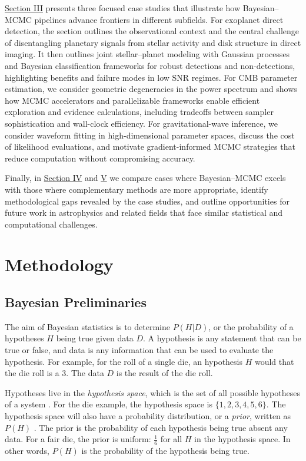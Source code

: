 \documentclass[preprint,longauthor]{aastex631}
\numberwithin{equation}{section}
\begin{document}
\hyperref[sec:CaseStudies]{Section III} presents three focused case studies that illustrate how Bayesian–MCMC pipelines advance frontiers in different subfields. For exoplanet direct detection, the section outlines the observational context and the central challenge of disentangling planetary signals from stellar activity and disk structure in direct imaging. It then outlines joint stellar–planet modeling with Gaussian processes and Bayesian classification frameworks for robust detections and non-detections, highlighting benefits and failure modes in low SNR regimes. For CMB parameter estimation, we consider geometric degeneracies in the power spectrum and shows how MCMC accelerators and parallelizable frameworks enable efficient exploration and evidence calculations, including tradeoffs between sampler sophistication and wall-clock efficiency. For gravitational-wave inference, we consider waveform fitting in high-dimensional parameter spaces, discuss the cost of likelihood evaluations, and motivate gradient-informed MCMC strategies that reduce computation without compromising accuracy.

Finally, in \hyperref[placeholder]{Section IV} and \hyperref[placeholder]{V} we compare cases where Bayesian–MCMC excels with those where complementary methods are more appropriate, identify methodological gaps revealed by the case studies, and outline opportunities for future work in astrophysics and related fields that face similar statistical and computational challenges.

\section{Methodology}
\label{sec:Methodology}

\subsection{Bayesian Preliminaries} %
The aim of Bayesian statistics is to determine $P(H|D)$, or the probability of a hypotheses $H$ being true given data $D$. A hypothesis is any statement that can be true or false, and data is any information that can be used to evaluate the hypothesis. For example, for the roll of a single die, an hypothesis $H$ would that the die roll is a 3. The data $D$ is the result of the die roll.

Hypotheses live in the \textit{hypothesis space}, which is the set of all possible hypotheses of a system \citep{brewer1BayesianInference2018}. For the die example, the hypothesis space is $\{1,2,3,4,5,6\}$. The hypothesis space will also have a probability distribution, or a \textit{prior}, written as $P(H)$ \citep{brewer1BayesianInference2018}. The prior is the probability of each hypothesis being true absent any data. For a fair die, the prior is uniform: $\frac{1}{6}$ for all $H$ in the hypothesis space. In other words, $P(H)$ is the probability of the hypothesis being true.
\end{document}
